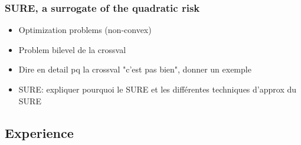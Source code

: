 \subsubsection{SURE, a surrogate of the quadratic risk}

\begin{itemize}
    \item Optimization problems (non-convex)
    \item Problem bilevel de la crossval
    \item Dire en detail pq la crossval "c'est pas bien", donner un exemple
    \item SURE: expliquer pourquoi le SURE et les différentes techniques d'approx du SURE
\end{itemize}
%
%
%
%
\subsection{Experience}
\label{sub:experience}
%

\clearpage

